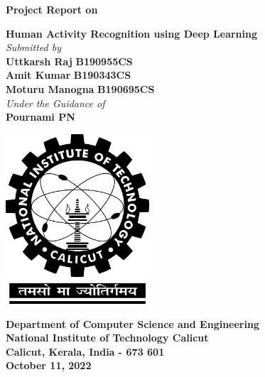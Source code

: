 \documentclass[twocolumn]{article}
\date{}
\begin{document}
\begin{titlepage}
\begin{center}
\vspace{1cm}
\normalsize
\textbf{Project Report on}\\
\vspace{0.5cm}

\Large
\textbf{Human Activity Recognition using Deep Learning}\\
\vspace{0.5cm}
\emph{Submitted by}\\        
\vspace{0.5cm}
\large
\textbf{Uttkarsh Raj} \hspace{0.75cm}    
\textbf{B190955CS}\\
\textbf{Amit Kumar} \hspace{0.75cm}    
\textbf{B190343CS}\\
\textbf{Moturu Manogna} \hspace{0.75cm}    
\textbf{B190695CS}\\
\vspace{0.2cm}
\emph{Under the Guidance of}\\ 
\large
\vspace{0.5cm}
\textbf{Pournami PN} 

\vspace{.5cm}
\begin{center}
 \includegraphics[width=0.4\textwidth]{nitc-logo.png}
\end{center}
\vspace{0.8cm}
\textbf{Department of Computer Science and Engineering}\\
\textbf{National Institute of Technology Calicut}\\
\textbf{Calicut, Kerala, India - 673 601}\\
\vspace{0.8cm}
\textbf{October 11, 2022} %
\end{center}
\end{titlepage}
\end{document}

